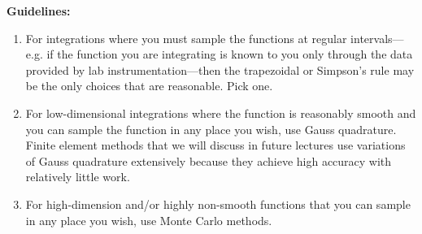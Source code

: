 \vspace{0.1cm}

\noindent\textbf{Guidelines:}
\begin{enumerate}
\item For integrations where you must sample the functions at regular intervals---e.g. if the function you are integrating is known to you only through the data provided by lab instrumentation---then the trapezoidal or Simpson's rule may be the only choices that are reasonable.  Pick one.

\item For low-dimensional integrations where the function is reasonably smooth and you can sample the function in any place you wish, use Gauss quadrature.  Finite element methods that we will discuss in future lectures use variations of Gauss quadrature extensively because they achieve high accuracy with relatively little work.

\item For high-dimension and/or highly non-smooth functions that you can sample in any place you wish, use Monte Carlo methods.  
\end{enumerate}
